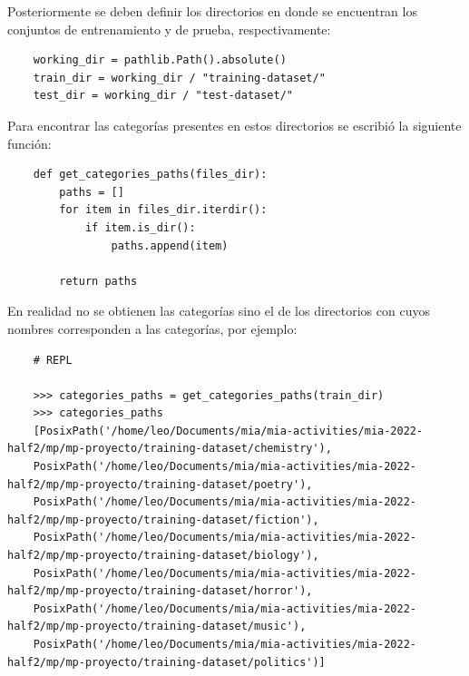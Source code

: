 Posteriormente se deben definir los directorios en donde se encuentran los conjuntos de entrenamiento y de prueba, respectivamente:
\begin{verbatim}
    working_dir = pathlib.Path().absolute()
    train_dir = working_dir / "training-dataset/"
    test_dir = working_dir / "test-dataset/"
\end{verbatim}

Para encontrar las categorías presentes en estos directorios se escribió la siguiente función:
\begin{verbatim}
    def get_categories_paths(files_dir):
        paths = []
        for item in files_dir.iterdir():
            if item.is_dir():
                paths.append(item)
        
        return paths
\end{verbatim}

En realidad no se obtienen las categorías sino el  de los directorios con cuyos nombres corresponden a las categorías, por ejemplo:
\begin{verbatim}
    # REPL

    >>> categories_paths = get_categories_paths(train_dir)
    >>> categories_paths
    [PosixPath('/home/leo/Documents/mia/mia-activities/mia-2022-half2/mp/mp-proyecto/training-dataset/chemistry'),
    PosixPath('/home/leo/Documents/mia/mia-activities/mia-2022-half2/mp/mp-proyecto/training-dataset/poetry'),
    PosixPath('/home/leo/Documents/mia/mia-activities/mia-2022-half2/mp/mp-proyecto/training-dataset/fiction'),
    PosixPath('/home/leo/Documents/mia/mia-activities/mia-2022-half2/mp/mp-proyecto/training-dataset/biology'),
    PosixPath('/home/leo/Documents/mia/mia-activities/mia-2022-half2/mp/mp-proyecto/training-dataset/horror'),
    PosixPath('/home/leo/Documents/mia/mia-activities/mia-2022-half2/mp/mp-proyecto/training-dataset/music'),
    PosixPath('/home/leo/Documents/mia/mia-activities/mia-2022-half2/mp/mp-proyecto/training-dataset/politics')]
 \end{verbatim}


